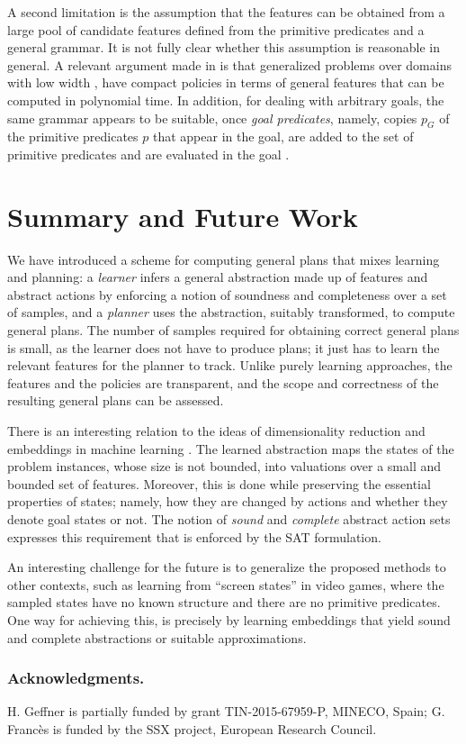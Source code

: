 \documentclass[letterpaper]{article} %
\begin{document}
A second limitation is the assumption that 
the features can be obtained from a large pool of candidate  features defined 
from the primitive predicates and a  general grammar.
It is not fully clear whether this assumption is reasonable in general.
A relevant argument made in  \cite{bonet:ijcai2018} is that generalized problems
over domains with low width \cite{nir:ecai2012}, have compact policies
in terms of general features that can be computed in polynomial time.
In addition, for dealing with arbitrary goals, the same grammar  appears
to be suitable, once  \emph{goal predicates}, namely, copies $p_G$ of the  primitive predicates $p$
that appear in the goal,  are added to the set of primitive predicates and are evaluated in the goal
\cite{martin-geffner:generalized}. 

\section{Summary and Future Work}

We have introduced a scheme for computing general plans that mixes
learning and planning: a \emph{learner} infers a general abstraction made
up of features and abstract actions by enforcing a notion of soundness
and completeness over a  set of samples, and a \emph{planner}
uses the abstraction, suitably transformed, to compute general plans. 
The number of samples required for obtaining correct general plans is
small, as the learner does not have to produce plans; it just
has to learn the relevant features for the planner to track.
Unlike purely learning approaches, the features and the policies
are transparent, and the scope and correctness
of the resulting general plans can be assessed.

There is  an interesting  relation to the ideas
of dimensionality reduction and embeddings in machine learning
\cite{hamilton:embeddings}. The learned abstraction
maps the  states of the problem instances, 
whose size is not bounded, into valuations over a small and bounded
set of features. Moreover,  this is done while preserving the   essential properties
of states; namely,  how they are changed by actions and whether they denote  goal states or not.
The notion of \emph{sound} and \emph{complete} abstract action sets expresses this requirement
that is enforced by  the SAT formulation.

An   interesting challenge for the future  is to generalize the proposed methods  to other   contexts,   such as learning  from ``screen states''
in video games,  where the sampled  states have no known structure and  there are no primitive predicates.
One way for  achieving this, is  precisely by learning embeddings that yield sound and complete abstractions or
suitable approximations.


\subsubsection{Acknowledgments.}
H. Geffner is partially funded by grant TIN-2015-67959-P, MINECO, Spain;
G. Franc\`{e}s is funded by the SSX project, European Research Council.



\end{document}

